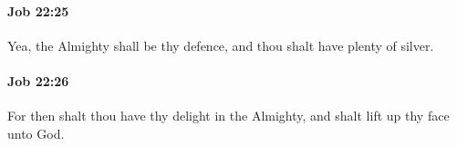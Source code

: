 		\paragraph{Job 22:25} %
			\label{JOB-22-25}

			Yea, the Almighty shall be thy defence, and thou shalt have plenty of silver.


		\paragraph{Job 22:26} %
			\label{JOB-22-26}

			For then shalt thou have thy delight in the Almighty, and shalt lift up thy face unto God.


